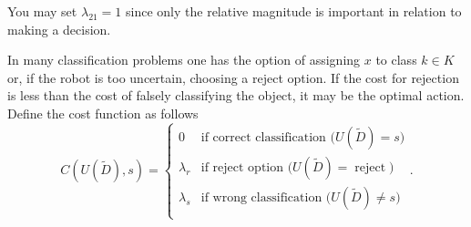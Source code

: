 \begin{example}
\begin{enumerate}
		You may set $\lambda_{21}=1$ since only the relative magnitude is important in relation to making a decision.
		
	\end{enumerate}
	
	
\end{example}


\begin{example}
	In many classification problems one has the option of assigning $x$ to class $k\in K$ or, if the robot is too uncertain, choosing a reject option. If the cost for rejection is less than the cost of falsely classifying the object, it may be the optimal action. Define the cost function as follows
	\begin{equation}
		C(U(\tilde{D}),s)=\begin{cases}
			0 & \text{if correct classification ($U(\tilde{D})=s$)}\\
			\lambda_r & \text{if reject option ($U(\tilde{D})=\operatorname{reject}$)}\\
			\lambda_s & \text{if wrong classification ($U(\tilde{D})\neq s$)}\\
		\end{cases}.
	\end{equation}
	

\end{example}
